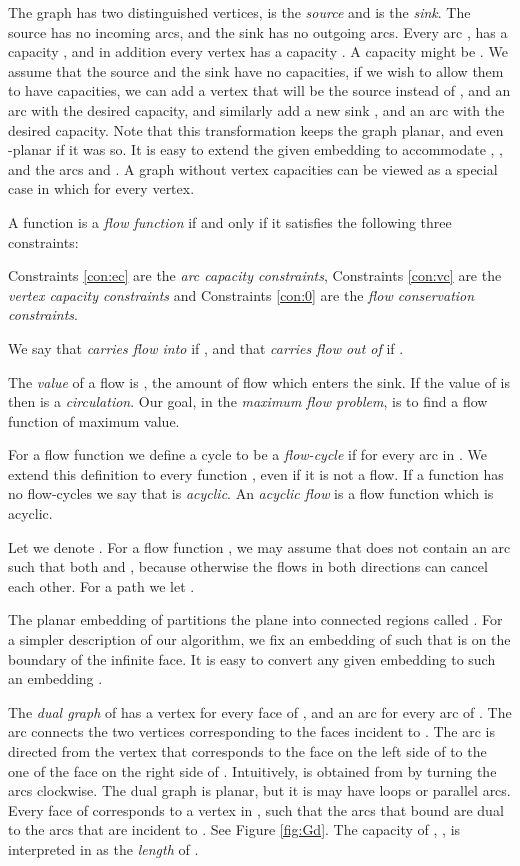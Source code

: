 \documentclass[a4paper,11pt]{article}
\begin{document}
The graph  has two distinguished vertices,  is the
\emph{source} and  is the \emph{sink}. The source  has no
incoming arcs, and the sink  has no outgoing arcs. Every arc ,
has a capacity , and in addition every vertex  has a capacity . A capacity might be . We assume that the
source and the sink have no capacities, if we wish to allow them to
have capacities, we can add a vertex  that will be the source
instead of , and an arc  with the desired capacity, and
similarly add a new sink , and an arc  with the desired
capacity. Note that this transformation keeps the graph planar, and
even -planar if it was so. It
is easy to extend the given embedding to accommodate , ,
and the arcs  and . A graph without vertex
capacities can be viewed as a special case in which 
for every vertex.

A function  is a \emph{flow function} if and only if
it satisfies the following three constraints:

Constraints \eqref{con:ec} are the \emph{arc capacity
  constraints}, Constraints \eqref{con:vc} are the
\emph{vertex capacity constraints} and Constraints \eqref{con:0}
are the \emph{flow conservation constraints}.

We say that  \emph{carries flow into}  if , and that  \emph{carries flow out of}  if .

The \emph{value} of a flow  is , the amount of flow which enters the sink. If the value of  is  then  is a \emph{circulation}. Our goal, in the \emph{maximum flow problem}, is to find a  flow function of maximum value.

For a flow function  we define a
 cycle   to be
a \emph{flow-cycle} if  for every arc in
.
We extend this definition to every function , even if it is not a flow.
If a function  has no flow-cycles we say that  is {\em acyclic}.
 An \emph{acyclic flow} is a  flow function
which is acyclic.

Let  we denote .
For a flow function , we may assume that  does not contain an arc  such that
both  and , because otherwise the flows in both directions can cancel each other.
For a path  we let .

The planar embedding of  partitions the plane into connected
regions called .
For a simpler description of our algorithm, we fix an embedding of 
such that  is on the boundary of the infinite face.
It is easy to convert any given embedding to such an embedding \cite{NC88}.

The
\emph{dual graph}  of  has a vertex  for every  face 
of , and an arc
 for every arc  of . The arc  connects the two vertices
corresponding to the faces incident to . The arc  is directed from
the vertex that corresponds to the face on the
left side of  to the one of the face on the right side of .
Intuitively,  is obtained from  by turning the arcs clockwise.
The dual graph  is planar, but it is may have loops or parallel arcs.
Every face  of  corresponds to a vertex  in , such that the
arcs that bound  are dual to the arcs that are incident to .
See Figure \ref{fig:Gd}.
The capacity of , , is interpreted in  as the \emph{length}
of .
\end{document}
